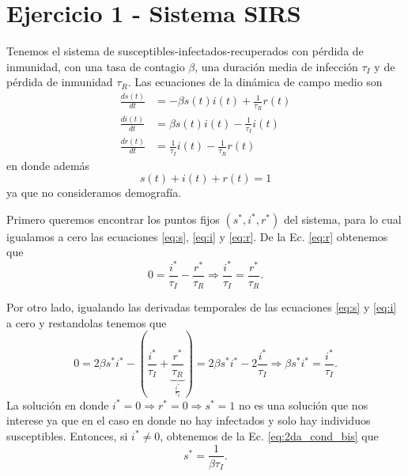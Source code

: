 \section*{Ejercicio 1 - Sistema SIRS}

Tenemos el sistema de susceptibles-infectados-recuperados con pérdida de inmunidad, con una tasa de contagio $\beta$, una duración media de infección $\tau_{I}$ y de pérdida de inmunidad $\tau_{R}$. Las ecuaciones de la dinámica de campo medio son
\begin{align}
    \frac{ds\left(t\right)}{dt} &=  -\beta s\left(t\right)i\left(t\right) + \frac{1}{\tau_{R}}r\left(t\right)\label{eq:s}\\
    \frac{di\left(t\right)}{dt} &=  \beta s\left(t\right)i\left(t\right) - \frac{1}{\tau_{I}}i\left(t\right) \label{eq:i}\\
    \frac{dr\left(t\right)}{dt} &=  \frac{1}{\tau_{I}}i\left(t\right) -\frac{1}{\tau_{R}}r\left(t\right)\label{eq:r}
\end{align}
en donde además
\begin{equation}
    s\left(t\right) + i\left(t\right) + r\left(t\right)  = 1 \label{eq:Normalizacion}
\end{equation}
ya que no consideramos demografía.

Primero queremos encontrar los puntos fijos $\left(s^*, i^*, r^*\right)$ del sistema, para lo cual igualamos a cero las ecuaciones \ref{eq:s}, \ref{eq:i} y \ref{eq:r}. De la Ec. \ref{eq:r} obtenemos que
\begin{equation}
    0 = \frac{i^*}{\tau_{I}} - \frac{r^*}{\tau_{R}} \Rightarrow \boxed{\frac{i^*}{\tau_{I}} = \frac{r^*}{\tau_{R}}}. \label{eq:1erCond}
\end{equation}

Por otro lado, igualando las derivadas temporales de las ecuaciones \ref{eq:s} y \ref{eq:i} a cero y restandolas tenemos que
\begin{equation}
    0 = 2\beta s^* i^* - ( \frac{i^*}{\tau_{I}} + \underbrace{\frac{r^*}{\tau_{R}}}_{\frac{i^*}{\tau_{I}}} ) = 2\beta s^* i^* - 2\frac{i^*}{\tau_{I}} \Rightarrow \beta s^* i^* = \frac{i^*}{\tau_{I}}. \label{eq:2da_cond_bis}
\end{equation}
La solución en donde $i^* = 0 \Rightarrow r^*=0 \Rightarrow s^* = 1$ no es una solución que nos interese ya que en el caso en donde no hay infectados y solo hay individuos susceptibles. Entonces, si $i^* \neq 0$, obtenemos de la Ec. \ref{eq:2da_cond_bis} que
\begin{equation}
    \boxed{s^* = \frac{1}{\beta \tau_{I}}}. \label{eq:2da_cond}
\end{equation}

